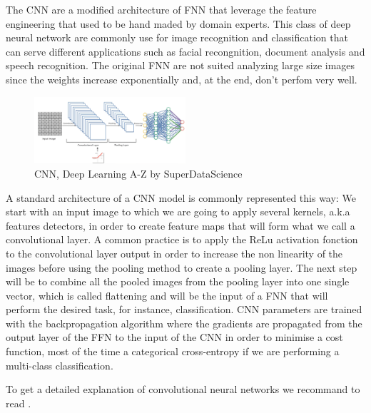 \documentclass[6pt,letter]{article}\usepackage[]{graphicx}\usepackage[]{color}
\begin{document}
The CNN are a modified architecture of FNN that leverage the feature engineering that used to be hand maded by domain experts. This class of deep neural network are commonly use for image recognition and classification that can serve different applications such as facial recongnition, document analysis and speech recognition. The original FNN are not suited analyzing large size images since the weights increase exponentially and, at the end, don't perfom very well.\\
\begin{figure}
  \begin{center}
    \includegraphics[width=0.5\textwidth]{figure/CNN_process.png}
  \end{center}
  \caption{CNN, Deep Learning A-Z by SuperDataScience}
  \label{fig:attention}
\end{figure}
A standard architecture of a CNN model is commonly represented this way: We start with an input image to which we are going to apply several kernels, a.k.a features detectors, in order to create feature maps that will form what we call a convolutional layer. A common practice is to apply the ReLu activation fonction to the convolutional layer output in order to increase the non linearity of the images before using the pooling method to create a pooling layer. The next step will be to combine all the pooled images from the pooling layer into one single vector, which is called flattening and will be the input of a FNN that will perform the desired task, for instance, classification. CNN parameters are trained with the backpropagation algorithm where the gradients are propagated from the output layer of the FFN to the input of the CNN in order to minimise a cost function, most of the time a categorical cross-entropy if we are performing a multi-class classification. 


To get a detailed explanation of convolutional neural networks we recommand to read \cite[Chapter 9]{Goodfellow-et-al-2016}.\\
\end{document}
